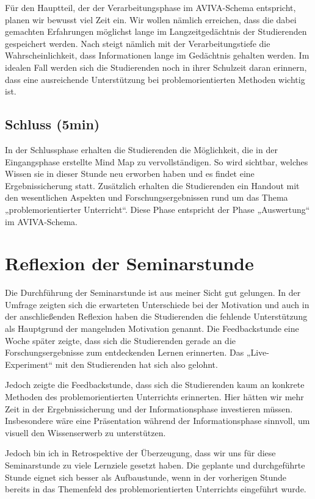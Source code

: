 \documentclass[man,12pt,a4paper]{apa6}
\begin{document}
Für den Hauptteil, der der Verarbeitungsphase im AVIVA-Schema entspricht, planen wir bewusst viel Zeit ein. Wir wollen nämlich erreichen, dass die dabei gemachten Erfahrungen möglichst lange im Langzeitgedächtnis der Studierenden gespeichert werden. Nach \textcite{craik1972} steigt nämlich mit der Verarbeitungstiefe die Wahrscheinlichkeit, dass Informationen lange im Gedächtnis gehalten werden. Im idealen Fall werden sich die Studierenden noch in ihrer Schulzeit daran erinnern, dass eine ausreichende Unterstützung bei problemorientierten Methoden wichtig ist.

\subsection{Schluss (5min)}

In der Schlussphase erhalten die Studierenden die Möglichkeit, die in der Eingangsphase erstellte Mind Map zu vervollständigen. So wird sichtbar, welches Wissen sie in dieser Stunde neu erworben haben und es findet eine Ergebnissicherung statt. Zusätzlich erhalten die Studierenden ein Handout mit den wesentlichen Aspekten und Forschungsergebnissen rund um das Thema „problemorientierter Unterricht“. Diese Phase entspricht der Phase „Auswertung“ im AVIVA-Schema.

\section{Reflexion der Seminarstunde}

Die Durchführung der Seminarstunde ist aus meiner Sicht gut gelungen. In der Umfrage zeigten sich die erwarteten Unterschiede bei der Motivation und auch in der anschließenden Reflexion haben die Studierenden die fehlende Unterstützung als Hauptgrund der mangelnden Motivation genannt. Die Feedbackstunde eine Woche später zeigte, dass sich die Studierenden gerade an die Forschungsergebnisse zum entdeckenden Lernen erinnerten. Das „Live-Experiment“ mit den Studierenden hat sich also gelohnt.

Jedoch zeigte die Feedbackstunde, dass sich die Studierenden kaum an konkrete Methoden des problemorientierten Unterrichts erinnerten. Hier hätten wir mehr Zeit in der Ergebnissicherung und der Informationsphase investieren müssen. Insbesondere wäre eine Präsentation während der Informationsphase sinnvoll, um visuell den Wissenserwerb zu unterstützen.

Jedoch bin ich in Retrospektive der Überzeugung, dass wir uns für diese Seminarstunde zu viele Lernziele gesetzt haben. Die geplante und durchgeführte Stunde eignet sich besser als Aufbaustunde, wenn in der vorherigen Stunde bereits in das Themenfeld des problemorientierten Unterrichts eingeführt wurde.
\end{document}
